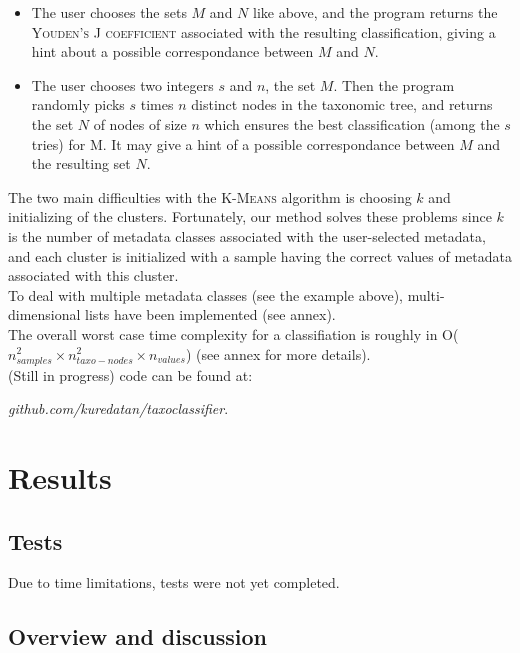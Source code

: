 \documentclass{report}
\begin{document}
\begin{itemize}
\item The user chooses the sets $M$ and $N$ like above, and the program returns the \textsc{Youden’s J coefficient} associated with the resulting classification, giving a hint about a possible correspondance between $M$ and $N$.
\item The user chooses two integers $s$ and $n$, the set $M$. Then the program randomly picks $s$ times $n$ distinct nodes in the taxonomic tree, and returns the set $N$ of nodes of size $n$ which ensures the best classification (among the $s$ tries) for M. It may give a hint of a possible correspondance between $M$ and the resulting set $N$.
\end{itemize}

The two main difficulties with the \textsc{K-Means} algorithm is choosing $k$ and initializing of the clusters. Fortunately, our method solves these problems since $k$ is the number of metadata classes associated with the user-selected metadata, and each cluster is initialized with a sample having the correct values of metadata associated with this cluster.\\

To deal with multiple metadata classes (see the example above), multi-dimensional lists have been implemented (see annex).\\

The overall worst case time complexity for a classifiation is roughly in O($n_{samples}^{2} \times n_{taxo-nodes}^{2} \times n_{values}$) (see annex for more details).\\

(Still in progress) code can be found at:\\ \begin{center}\emph{github.com/kuredatan/taxoclassifier}.\end{center}

\section{Results}

\subsection{Tests}

Due to time limitations, tests were not yet completed.\\

\subsection{Overview and discussion}
\end{document}
